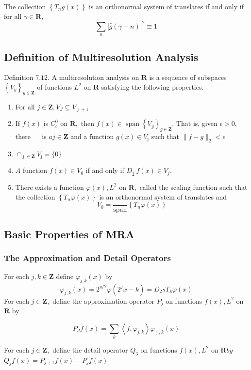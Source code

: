 The collection $\left\{T_{n} g(x)\right\}$ is an orthonormal system of translates
if and only if for all $\gamma \in \mathbf{R}$,
$$
\sum_{n}|\widehat{g}(\gamma+n)|^{2} \equiv 1
$$


\subsection{Definition of Multiresolution Analysis}

\begin{definition}
Definition $7.12 .$ A multiresolution analysis on $\mathbf{R}$ is a sequence of subspaces
$\left\{V_{y}\right\}_{y \in \mathbf{Z}}$ of functions $L^{2}$ on $\mathbf{R}$ satisfying the following properties.
\begin{enumerate}
    
\item  For all $j \in \mathbf{Z}, V_{J} \subseteq V_{\jmath+1}$

\item  If $f(x)$ is $C_{c}^{0}$ on $\mathbf{R},$ then $f(x) \in \operatorname{span}\left\{V_{y}\right\}_{g \in \mathbf{Z}} .$ That is, given $\epsilon>0,$ there
$\quad$ is $a j \in \mathbf{Z}$ and a function $g(x) \in V_{\jmath}$ such that $\|f-g\|_{2}<\epsilon$

\item  $\cap_{\jmath \in \mathbf{Z}} V_{\jmath}=\{0\}$

\item  $A$ function $f(x) \in V_{0}$ if and only if $D_{2^{\prime}} f(x) \in V_{j}$.

\item  There exists a function $\varphi(x), L^{2}$ on $\mathbf{R},$ called the scaling function such that the collection $\left\{T_{n} \varphi(x)\right\}$ is an orthonormal system of translates and
$$
V_{0}=\frac{ }{\operatorname{span}}\left\{T_{n} \varphi(x)\right\}
$$
\end{enumerate}
\end{definition}


\subsection{Basic Properties of MRA}
\subsubsection{The Approximation and Detail Operators}
\begin{definition}

For each $j, k \in \mathbf{Z}$ define $\varphi_{j, k}(x)$  by
$$
\varphi_{j, k}(x)=2^{y / 2} \varphi\left(2^{j} x-k\right)=D_{2} s T_{k} \varphi(x)
$$
For each $j \in \mathbf{Z},$ define the approximation operator $P_{j}$ on functions $f(x), L^{2}$ on$\mathbf{R}$ by

$$
P_{J} f(x)=\sum_{k}\left\langle f, \varphi_{j, k}\right\rangle \varphi_{\jmath, k}(x)
$$

For each $j \in \mathbf{Z},$ define the detail operator $Q_{3}$ on functions $f(x), L^{2}$ on $\mathbf{R} b y$
$Q_{j} f(x)=P_{j+1} f(x)-P_{j} f(x)$
\end{definition}

